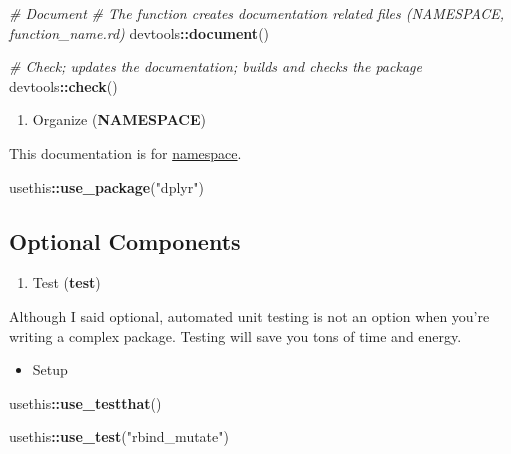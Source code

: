 \documentclass[
]{book}
\newenvironment{Shaded}{\begin{snugshade}}{\end{snugshade}}
\newcommand{\CommentTok}[1]{\textcolor[rgb]{0.56,0.35,0.01}{\textit{#1}}}
\newcommand{\KeywordTok}[1]{\textcolor[rgb]{0.13,0.29,0.53}{\textbf{#1}}}
\newcommand{\NormalTok}[1]{#1}
\newcommand{\OperatorTok}[1]{\textcolor[rgb]{0.81,0.36,0.00}{\textbf{#1}}}
\newcommand{\StringTok}[1]{\textcolor[rgb]{0.31,0.60,0.02}{#1}}
\providecommand{\tightlist}{%
  \setlength{\itemsep}{0pt}\setlength{\parskip}{0pt}}
\begin{document}
\begin{Shaded}
\begin{Highlighting}[]
\CommentTok{\# Document }
\CommentTok{\# The function creates documentation related files (NAMESPACE, function\_name.rd)}
\NormalTok{devtools}\OperatorTok{::}\KeywordTok{document}\NormalTok{()}

\CommentTok{\# Check; updates the documentation; builds and checks the package }
\NormalTok{devtools}\OperatorTok{::}\KeywordTok{check}\NormalTok{()}
\end{Highlighting}
\end{Shaded}

\begin{enumerate}
\def\labelenumi{\arabic{enumi}.}
\setcounter{enumi}{3}
\tightlist
\item
  Organize (\textbf{NAMESPACE})
\end{enumerate}

This documentation is for \href{https://en.wikipedia.org/wiki/Namespace}{namespace}.

\begin{Shaded}
\begin{Highlighting}[]
\NormalTok{usethis}\OperatorTok{::}\KeywordTok{use\_package}\NormalTok{(}\StringTok{"dplyr"}\NormalTok{)}
\end{Highlighting}
\end{Shaded}

\hypertarget{optional-components}{%
\subsection{Optional Components}\label{optional-components}}

\begin{enumerate}
\def\labelenumi{\arabic{enumi}.}
\tightlist
\item
  Test (\textbf{test})
\end{enumerate}

Although I said optional, automated unit testing is not an option when you're writing a complex package. Testing will save you tons of time and energy.

\begin{itemize}
\tightlist
\item
  Setup
\end{itemize}

\begin{Shaded}
\begin{Highlighting}[]
\NormalTok{usethis}\OperatorTok{::}\KeywordTok{use\_testthat}\NormalTok{()}

\NormalTok{usethis}\OperatorTok{::}\KeywordTok{use\_test}\NormalTok{(}\StringTok{"rbind\_mutate"}\NormalTok{)}
\end{Highlighting}
\end{Shaded}
\end{document}

